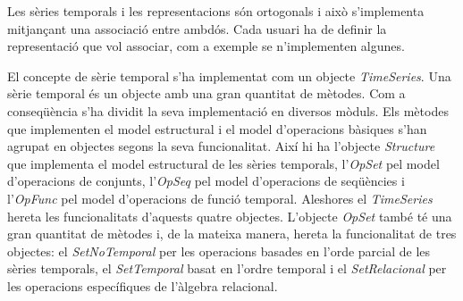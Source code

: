 









Les sèries temporals i les representacions són ortogonals i això
s'implementa mitjançant una associació entre ambdós. Cada usuari ha de
definir la representació que vol associar, com a exemple se
n'implementen algunes. 




El concepte de sèrie temporal s'ha implementat com un objecte
\emph{TimeSeries}.  Una sèrie temporal és un objecte amb una gran
quantitat de mètodes. Com a conseqüència s'ha dividit la seva
implementació en diversos mòduls. Els mètodes que implementen el model
estructural i el model d'operacions bàsiques s'han agrupat en objectes
segons la seva funcionalitat. Així hi ha l'objecte \emph{Structure}
que implementa el model estructural de les sèries temporals,
l'\emph{OpSet} pel model d'operacions de conjunts, l'\emph{OpSeq} pel
model d'operacions de seqüències i l'\emph{OpFunc} pel model
d'operacions de funció temporal.  Aleshores el \emph{TimeSeries}
hereta les funcionalitats d'aquests quatre objectes.  L'objecte
\emph{OpSet} també té una gran quantitat de mètodes i, de la mateixa
manera, hereta la funcionalitat de tres objectes: el
\emph{SetNoTemporal} per les operacions basades en l'orde parcial de
les sèries temporals, el \emph{SetTemporal} basat en l'ordre temporal
i el \emph{SetRelacional} per les operacions específiques de l'àlgebra
relacional.





